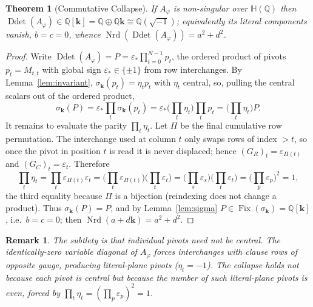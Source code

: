 \documentclass[pdflatex,sn-mathphys-num]{sn-jnl}
\theoremstyle{thmstyleone}%
\newtheorem{theorem}{Theorem}%
\theoremstyle{thmstyletwo}%
\newtheorem{remark}{Remark}%
\theoremstyle{thmstylethree}%
\newcommand{\HH}{\mathbb{H}}
\newcommand{\QQ}{\mathbb{Q}}
\newcommand{\Nrd}{\operatorname{Nrd}}
\newcommand{\Ddet}{\operatorname{Ddet}}
\newcommand{\Fix}{\operatorname{Fix}}
\newcommand{\bk}{\mathbf{k}}
\newcommand{\Aphi}{A_{\varphi}}
\begin{document}
\begin{theorem}[Commutative Collapse]\label{thm:collapse}
If $\Aphi$ is non-singular over $\HH(\QQ)$ then
$\Ddet(\Aphi)\in\QQ[\bk]=\QQ\oplus\QQ\bk\cong\QQ(\sqrt{-1})$; equivalently
its literal components vanish, $b=c=0$, whence
$\Nrd(\Ddet(\Aphi))=a^2+d^2$.
\end{theorem}

\begin{proof}
Write $\Ddet(\Aphi)=P=\varepsilon_\ast\prod_{t=0}^{N-1}p_t$, the ordered
product of pivots $p_t=M_{t,t}$ with global sign
$\varepsilon_\ast\in\{\pm1\}$ from row interchanges. By
Lemma~\ref{lem:invariant}, $\sigma_{\bk}(p_t)=\eta_t p_t$ with $\eta_t$
central, so, pulling the central scalars out of the ordered product,
\[
  \sigma_{\bk}(P)=\varepsilon_\ast\prod_t\sigma_{\bk}(p_t)
  =\varepsilon_\ast\Big(\prod_t\eta_t\Big)\prod_t p_t
  =\Big(\prod_t\eta_t\Big)P .
\]
It remains to evaluate the parity $\prod_t\eta_t$. Let $\Pi$ be the final
cumulative row permutation. The interchange used at column $t$ only swaps
rows of index $>t$, so once the pivot in position $t$ is read it is never
displaced; hence $(G_R)_t=\varepsilon_{\Pi(t)}$ and $(G_C)_t=\varepsilon_t$.
Therefore
\[
  \prod_{t}\eta_t=\prod_t\varepsilon_{\Pi(t)}\varepsilon_t
  =\Big(\prod_t\varepsilon_{\Pi(t)}\Big)\Big(\prod_t\varepsilon_t\Big)
  =\Big(\prod_s\varepsilon_s\Big)\Big(\prod_t\varepsilon_t\Big)
  =\Big(\prod_p\varepsilon_p\Big)^2=1,
\]
the third equality because $\Pi$ is a bijection (reindexing does not change
a product). Thus $\sigma_{\bk}(P)=P$, and by Lemma~\ref{lem:sigma}
$P\in\Fix(\sigma_{\bk})=\QQ[\bk]$, i.e.\ $b=c=0$; then
$\Nrd(a+d\bk)=a^2+d^2$.
\end{proof}

\begin{remark}\label{rem:parity}
The subtlety is that individual pivots need \emph{not} be central. The
identically-zero variable diagonal of $\Aphi$ forces interchanges with
clause rows of opposite gauge, producing literal-plane pivots
($\eta_t=-1$). The collapse holds not because each pivot is central but
because the number of such literal-plane pivots is \emph{even}, forced by
$\prod_t\eta_t=(\prod_p\varepsilon_p)^2=1$.
\end{remark}
\end{document}
